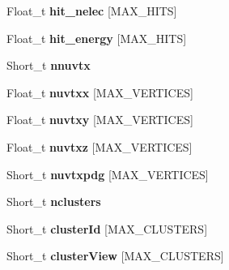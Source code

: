 \begin{DoxyCompactItemize}
\item 
\hypertarget{classanatree_a422a1eb463bc395d117a4e2e6dc2b4ba}{Float\-\_\-t {\bfseries hit\-\_\-nelec} \mbox{[}M\-A\-X\-\_\-\-H\-I\-T\-S\mbox{]}}\label{classanatree_a422a1eb463bc395d117a4e2e6dc2b4ba}

\item 
\hypertarget{classanatree_acde23195130ed65218a46955bd79a8f3}{Float\-\_\-t {\bfseries hit\-\_\-energy} \mbox{[}M\-A\-X\-\_\-\-H\-I\-T\-S\mbox{]}}\label{classanatree_acde23195130ed65218a46955bd79a8f3}

\item 
\hypertarget{classanatree_a72c05e2c01f85575b911ccd47060bfbd}{Short\-\_\-t {\bfseries nnuvtx}}\label{classanatree_a72c05e2c01f85575b911ccd47060bfbd}

\item 
\hypertarget{classanatree_ae396ae06e085b0021c54968668519b1b}{Float\-\_\-t {\bfseries nuvtxx} \mbox{[}M\-A\-X\-\_\-\-V\-E\-R\-T\-I\-C\-E\-S\mbox{]}}\label{classanatree_ae396ae06e085b0021c54968668519b1b}

\item 
\hypertarget{classanatree_af7bc58e94bad55538d5d72697de485d6}{Float\-\_\-t {\bfseries nuvtxy} \mbox{[}M\-A\-X\-\_\-\-V\-E\-R\-T\-I\-C\-E\-S\mbox{]}}\label{classanatree_af7bc58e94bad55538d5d72697de485d6}

\item 
\hypertarget{classanatree_a8b24134ada26040c2c70bc0aa7f8732a}{Float\-\_\-t {\bfseries nuvtxz} \mbox{[}M\-A\-X\-\_\-\-V\-E\-R\-T\-I\-C\-E\-S\mbox{]}}\label{classanatree_a8b24134ada26040c2c70bc0aa7f8732a}

\item 
\hypertarget{classanatree_a9202f57b945c52d6579fc9ec9938829a}{Short\-\_\-t {\bfseries nuvtxpdg} \mbox{[}M\-A\-X\-\_\-\-V\-E\-R\-T\-I\-C\-E\-S\mbox{]}}\label{classanatree_a9202f57b945c52d6579fc9ec9938829a}

\item 
\hypertarget{classanatree_a0b190f9cf843aa1aa7d2c0cccf1addeb}{Short\-\_\-t {\bfseries nclusters}}\label{classanatree_a0b190f9cf843aa1aa7d2c0cccf1addeb}

\item 
\hypertarget{classanatree_a473ab2c02b36fd4cae6aed6e9da33f32}{Short\-\_\-t {\bfseries cluster\-Id} \mbox{[}M\-A\-X\-\_\-\-C\-L\-U\-S\-T\-E\-R\-S\mbox{]}}\label{classanatree_a473ab2c02b36fd4cae6aed6e9da33f32}

\item 
\hypertarget{classanatree_a48678b60b63909c9e0a1d33088c7293f}{Short\-\_\-t {\bfseries cluster\-View} \mbox{[}M\-A\-X\-\_\-\-C\-L\-U\-S\-T\-E\-R\-S\mbox{]}}\label{classanatree_a48678b60b63909c9e0a1d33088c7293f}


\end{DoxyCompactItemize}
